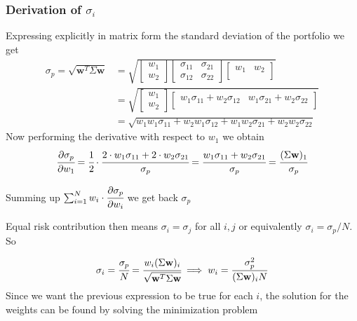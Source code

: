 \begin{attention}
\subsubsection{Derivation of $\sigma_i$}
Expressing explicitly in matrix form the standard deviation of the portfolio we get
\[
\begin{split}
\sigma_p={\sqrt {\mathbf{w}^T\Sigma \mathbf{w}}} & =
\sqrt{
	\begin{bmatrix}
	w_{1} \\
	w_{2}
	\end{bmatrix}
	\begin{bmatrix}
	\sigma_{11} & \sigma_{21} \\
	\sigma_{12} & \sigma_{22} 
	\end{bmatrix}
	\begin{bmatrix}
	w_{1} & w_{2} \\
	\end{bmatrix}
}\\
&=
\sqrt{
	\begin{bmatrix}
	w_{1} \\
	w_{2}
	\end{bmatrix}
	\begin{bmatrix}
w_{1}\sigma_{11} + w_{2}\sigma_{12} & w_{1}\sigma_{21} + w_{2}\sigma_{22} \\
	\end{bmatrix}
} \\
&= \sqrt{
w_{1}w_{1}\sigma_{11} + w_{2}w_{1}\sigma_{12} + w_{1}w_{2}\sigma_{21} + w_{2}w_{2}\sigma_{22} }
\end{split}
\]
Now performing the derivative with respect to $w_1$ we obtain
\[\cfrac{\partial\sigma_p}{\partial w_1} = \cfrac{1}{2}\cdot\cfrac{2\cdot w_1\sigma_{11} + 2\cdot w_{2}\sigma_{21}}{\sigma_p} = \cfrac{w_1\sigma_{11} + w_{2}\sigma_{21}}{\sigma_p} = \cfrac{(\Sigma \mathbf{w})_{1}}{\sigma_p}\]
	
Summing up $\sum_{i=1}^{N} w_i\cdot\cfrac{\partial\sigma_p}{\partial w_i}$ we get back $\sigma_p$
\end{attention}

Equal risk contribution then means \(\sigma _{i} =\sigma _{j}\) for all \(i,j\) or equivalently \(\sigma _{i}=\sigma_p/N\). So

\begin{equation}
\sigma _{i} = \cfrac{\sigma_p}{N}={\cfrac {w_{i}(\Sigma \mathbf{w})_{i}}{\sqrt {\mathbf{w}^T\Sigma \mathbf{w}}}}\implies w_{i} = \frac {\sigma_p^{2}}{(\Sigma \mathbf{w})_{i}N}
\label{eq:risk_parity_weights}
\end{equation}
Since we want the previous expression to be true for each $i$, the solution for the weights can be found by solving the minimization problem

